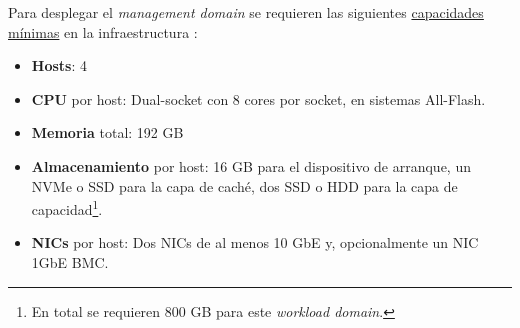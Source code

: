 
Para desplegar el \textit{management domain} se requieren las siguientes \underline{capacidades mínimas} en la infraestructura \cite{WDminRequierements}:
\begin{itemize}
    \item \textbf{Hosts}: 4
    \item \textbf{CPU} por host: Dual-socket con 8 cores por socket, en sistemas All-Flash.
    \item \textbf{Memoria} total: 192 GB
    \item \textbf{Almacenamiento} por host: 16 GB para el dispositivo de arranque, un NVMe o SSD para la capa de caché, dos SSD o HDD para la capa de capacidad\footnote{En total se requieren 800 GB para este \textit{workload domain}.}.
    \item \textbf{NICs} por host: Dos NICs de al menos 10 GbE y, opcionalmente un NIC 1GbE BMC.
\end{itemize}

